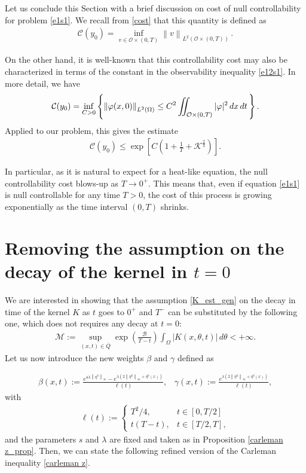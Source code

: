 \documentclass{amsart}    %
\newcommand{\D}{\displaystyle}
\newcommand{\norm}[2]{\left\|#1\right\|_{#2}}
\newcommand{\intd}{\displaystyle\int \kern -7pt \int}
\begin{document}
Let us conclude this Section with a brief discussion on cost of null controllability for problem \eqref{e1s1}. We recall from \eqref{cost} that this quantity is defined as 
\begin{align*}
	\mathcal C(y_0)=\D\inf_{v\in{\mathcal O\times(0,T)}}\norm{v}{L^2(\mathcal O\times(0,T))}\,.
\end{align*}

On the other hand, it is well-known that this controllability cost may also be characterized in terms of the constant in the observability inequality \eqref{e12s1}. In more detail, we have 
\begin{align*}
	\mathcal C(y_0)=\inf_{C>0}\left\{\norm{\varphi(x,0)}{L^2(\Omega)} \leq C^2 \intd_{{ \mathcal O}\times(0,T)}|\varphi|^{2}\,dx\,dt\,\right\}.
\end{align*}
Applied to our problem, this gives the estimate
\begin{align*}
	\mathcal C(y_0)\leq\exp\left[C\left(1+\frac{1}{T}+\mathcal{K}^{\frac 23}\right)\right].
\end{align*}

In particular, as it is natural to expect for a heat-like equation, the null controllability cost blows-up as $T\to 0^+$. This means that, even if equation \eqref{e1s1} is null controllable for any time $T>0$, the cost of this process is growing exponentially as the time interval $(0,T)$ shrinks.

\section{Removing the assumption on the decay of the kernel in $t=0$}\label{decay_sec}

We are interested in showing that the assumption \eqref{K_est_gen} on the decay in time of the kernel $K$ as $t$ goes to $0^+$ and $T^-$ can be substituted by the following one, which does not requires any decay at $t=0$:
\begin{align}\label{K_est_weak}
	\mathcal{M}:=\sup_{(x,t)\in\overline{Q}}\exp\left(\frac{\mathcal{B}}{T-t}\right)\int_{\Omega} |K(x,\theta,t)|\,d\theta <+\infty.
\end{align}
Let us now introduce the new weights $\beta$ and $\gamma$ defined as

\begin{align*}
	\beta(x,t):=\frac{e^{4\lambda\norm{\eta^0}{\infty}}-e^{\lambda\left(2\norm{\eta^0}{\infty}+\eta^0(x)\right)}}{\ell(t)}, \;\;\; \gamma(x,t):=\frac{e^{\lambda\left(2\norm{\eta^0}{\infty}+\eta^0(x)\right)}}{\ell(t)},
\end{align*}
with
\begin{align*}
	\ell(t):=\begin{cases}
		\D T^2/4, & t\in\left[0,T/2\right]
		\\
		\D t(T-t), & t\in\left[T/2, T\right],
	\end{cases}
\end{align*}
and the parameters $s$ and $\lambda$ are fixed and taken as in Proposition \ref{carleman z_prop}. Then, we can state the following refined version of the Carleman inequality \eqref{carleman z}.
\end{document}

